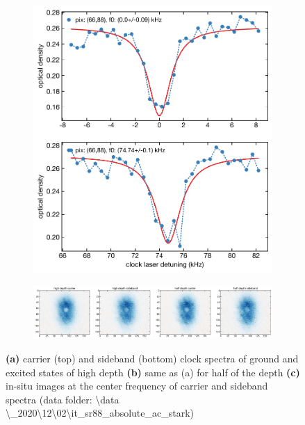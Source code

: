 \begin{figure}
\begin{subfigure}[b]{0.4\linewidth}
				\includegraphics[scale=0.5]{figures/half_depth66_88.pdf}
				\caption{}
			\end{subfigure}

			\begin{subfigure}{\linewidth}
				\includegraphics[scale=0.4]{figures/insitu_images.pdf}
				\caption{}
			\end{subfigure}
			\caption{\textbf{(a)} carrier (top) and sideband (bottom) clock spectra of ground and excited states of high depth \textbf{(b)} same as (a) for half of the depth \textbf{(c)} in-situ \SSZ images at the center frequency of carrier and sideband spectra (data folder: \textbackslash data \textbackslash\_2020\textbackslash12\textbackslash02\textbackslash it\_sr88\_absolute\_ac\_stark)} 
			\label{fig:total_ac_stark_spectrum}

			\end{figure}


